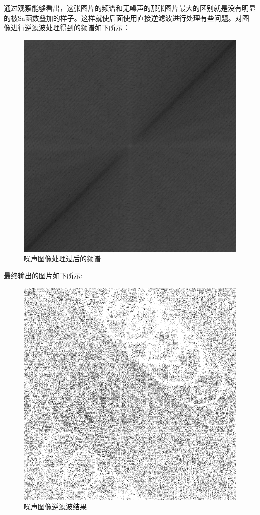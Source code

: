 \documentclass{article}
\begin{document}
	通过观察能够看出，这张图片的频谱和无噪声的那张图片最大的区别就是没有明显的被Sa函数叠加的样子。这样就使后面使用直接逆滤波进行处理有些问题。对图像进行逆滤波处理得到的频谱如下所示：
	\begin{figure}[H]
		\centering
		\includegraphics[scale = 0.5]{noise_processed.png}
		\caption{噪声图像处理过后的频谱}
	\end{figure}
	
	最终输出的图片如下所示:
	\begin{figure}[H]
		\centering
		\includegraphics[scale = 0.5]{noise_result1.png}
		\caption{噪声图像逆滤波结果}
	\end{figure}
	
\end{document}
